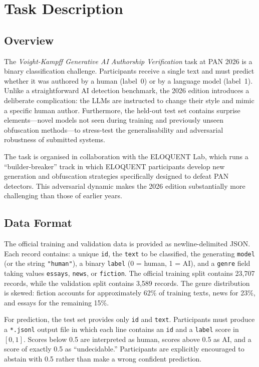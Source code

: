 
\section{Task Description}
\label{sec:task}

\subsection{Overview}

The \textit{Voight-Kampff Generative AI Authorship Verification} task at PAN 2026 is a binary classification challenge. Participants receive a single text and must predict whether it was authored by a human (label~0) or by a language model (label~1). Unlike a straightforward AI detection benchmark, the 2026 edition introduces a deliberate complication: the LLMs are instructed to change their style and mimic a specific human author. Furthermore, the held-out test set contains surprise elements—novel models not seen during training and previously unseen obfuscation methods—to stress-test the generalisability and adversarial robustness of submitted systems.

The task is organised in collaboration with the ELOQUENT Lab, which runs a ``builder-breaker'' track in which ELOQUENT participants develop new generation and obfuscation strategies specifically designed to defeat PAN detectors. This adversarial dynamic makes the 2026 edition substantially more challenging than those of earlier years.

\subsection{Data Format}

The official training and validation data is provided as newline-delimited JSON. Each record contains: a unique \texttt{id}, the \texttt{text} to be classified, the generating \texttt{model} (or the string \texttt{"human"}), a binary \texttt{label} (0 = human, 1 = AI), and a \texttt{genre} field taking values \texttt{essays}, \texttt{news}, or \texttt{fiction}. The official training split contains 23,707 records, while the validation split contains 3,589 records. The genre distribution is skewed: fiction accounts for approximately 62\% of training texts, news for 23\%, and essays for the remaining 15\%.

For prediction, the test set provides only \texttt{id} and \texttt{text}. Participants must produce a \texttt{*.jsonl} output file in which each line contains an \texttt{id} and a \texttt{label} score in $[0,1]$. Scores below 0.5 are interpreted as human, scores above 0.5 as AI, and a score of exactly 0.5 as ``undecidable.'' Participants are explicitly encouraged to abstain with 0.5 rather than make a wrong confident prediction.

